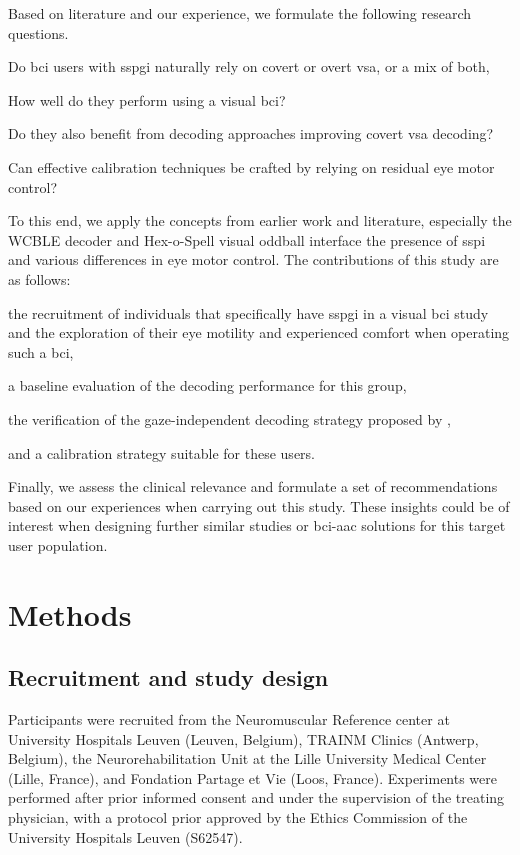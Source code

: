 \documentclass{article}
\begin{document}
Based on literature and our experience, we formulate the following research
questions.
\begin{enumerate*}[label={(\arabic*)}]
	\item Do \ac{bci} users with \ac{sspgi} naturally rely on covert or overt
	      \ac{vsa}, or a mix of both,
	\item How well do they perform using a visual \ac{bci}?
	\item Do they also benefit from decoding approaches improving covert \ac{vsa} decoding?
	\item Can effective calibration techniques be crafted by relying on residual eye
	      motor control?
\end{enumerate*}
To this end, we apply the concepts from earlier work and literature, especially
the WCBLE decoder and Hex-o-Spell visual oddball interface the presence of
\ac{sspi} and various  differences in eye motor control.
The contributions of this study are as follows:
\begin{enumerate*}[label={(\arabic*)}]
	\item the recruitment of individuals that specifically have \ac{sspgi} in
	      a visual \ac{bci} study and the exploration of their eye motility and
	      experienced comfort when operating such a \ac{bci},
	\item a baseline evaluation of the decoding performance for this group,
	\item the verification of the gaze-independent decoding strategy proposed by
	      \textcite{VanDenKerchove2024},
	\item and a calibration strategy suitable for these users.
\end{enumerate*}
Finally, we assess the clinical relevance and formulate a set of recommendations
based on our experiences when carrying out this study.
These insights could be of interest when designing further similar
studies or \ac{bci}-\ac{aac} solutions for this target user population.

\section{Methods}
\subsection{Recruitment and study design}
Participants were recruited from the Neuromuscular Reference center at
University Hospitals Leuven (Leuven, Belgium), TRAINM Clinics
(Antwerp, Belgium), the Neurorehabilitation Unit at the Lille University
Medical Center (Lille, France), and Fondation Partage et Vie (Loos,
France).
Experiments were performed after prior informed consent and under the supervision
of the treating physician, with a protocol prior approved by the Ethics Commission
of the University Hospitals Leuven (S62547).
\end{document}
